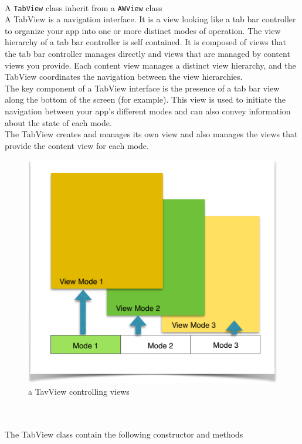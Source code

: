 \documentclass[a4paper,11pt]{extarticle}
\begin{document}
~\\ A \texttt{TabView} class inherit from a \texttt{AWView} class
~\\ A TabView is a navigation interface. It is a view looking like a tab bar controller to organize your app into one or more distinct modes of operation. The view hierarchy of a tab bar controller is self contained. It is composed of views that the tab bar controller manages directly and views that are managed by content views  you provide. Each content view manages a distinct view hierarchy, and the TabView coordinates the navigation between the view hierarchies.
~\\The key component of a TabView interface is the presence of a tab bar view along the bottom of the screen (for example). This view is used to initiate the navigation between your app’s different modes and can also convey information about the state of each mode.
~\\The TabView creates and manages its own view and also manages the views that provide the content view for each mode.

\begin{figure}[htbp]
   \centering
   \includegraphics[scale=0.7]{AWFig14.png} 
   \caption{a TavView controlling views}
   \label{fig:14 }
\end{figure}

~\\

~\\ The TabView class contain the following constructor and methods
\end{document}
